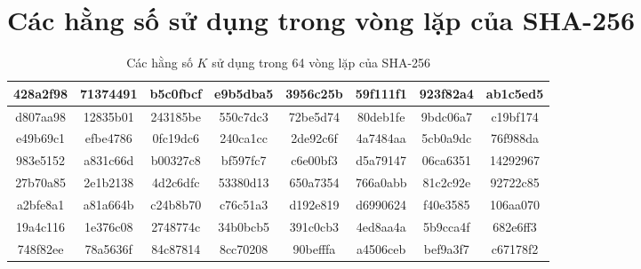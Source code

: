 \appendix

\section{Các hằng số sử dụng trong vòng lặp của SHA-256}

\begin{table}[H]
	\centering
	\caption{Các hằng số $K$ sử dụng trong 64 vòng lặp của SHA-256}
	\label{tab:sha256-k-constants}
	\begin{tabular}{|c|c|c|c|c|c|c|c|}
		\hline
		428a2f98 & 71374491 & b5c0fbcf & e9b5dba5 & 3956c25b & 59f111f1 & 923f82a4 & ab1c5ed5 \\ \hline
		d807aa98 & 12835b01 & 243185be & 550c7dc3 & 72be5d74 & 80deb1fe & 9bdc06a7 & c19bf174 \\ \hline
		e49b69c1 & efbe4786 & 0fc19dc6 & 240ca1cc & 2de92c6f & 4a7484aa & 5cb0a9dc & 76f988da \\ \hline
		983e5152 & a831c66d & b00327c8 & bf597fc7 & c6e00bf3 & d5a79147 & 06ca6351 & 14292967 \\ \hline
		27b70a85 & 2e1b2138 & 4d2c6dfc & 53380d13 & 650a7354 & 766a0abb & 81c2c92e & 92722c85 \\ \hline
		a2bfe8a1 & a81a664b & c24b8b70 & c76c51a3 & d192e819 & d6990624 & f40e3585 & 106aa070 \\ \hline
		19a4c116 & 1e376c08 & 2748774c & 34b0bcb5 & 391c0cb3 & 4ed8aa4a & 5b9cca4f & 682e6ff3 \\ \hline
		748f82ee & 78a5636f & 84c87814 & 8cc70208 & 90befffa & a4506ceb & bef9a3f7 & c67178f2 \\ \hline
	\end{tabular}
\end{table}